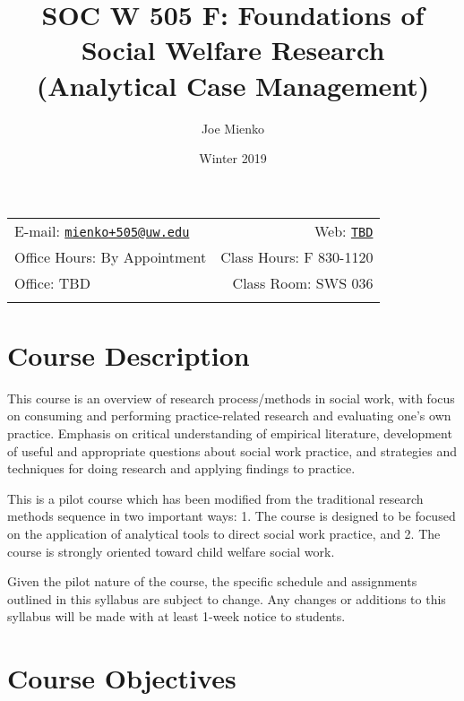 \documentclass[11pt,]{article}
\title{SOC W 505 F: Foundations of Social Welfare Research (Analytical Case
Management)}
\author{Joe Mienko}
\date{Winter 2019}
\begin{document}
  

		\maketitle
		
	
		\thispagestyle{firststyle}



	\noindent \begin{tabular*}{\textwidth}{ @{\extracolsep{\fill}} lr @{\extracolsep{\fill}}}


E-mail: \texttt{\href{mailto:mienko+505@uw.edu}{\nolinkurl{mienko+505@uw.edu}}} & Web: \href{http://TBD}{\tt TBD}\\
Office Hours: By Appointment  &  Class Hours: F 830-1120\\
Office: TBD  & Class Room: SWS 036\\
	&  \\
	\hline
	\end{tabular*}
	
\vspace{2mm}
	


\section{Course Description}\label{course-description}

This course is an overview of research process/methods in social work,
with focus on consuming and performing practice-related research and
evaluating one's own practice. Emphasis on critical understanding of
empirical literature, development of useful and appropriate questions
about social work practice, and strategies and techniques for doing
research and applying findings to practice.

This is a pilot course which has been modified from the traditional
research methods sequence in two important ways: 1. The course is
designed to be focused on the application of analytical tools to direct
social work practice, and 2. The course is strongly oriented toward
child welfare social work.

Given the pilot nature of the course, the specific schedule and
assignments outlined in this syllabus are subject to change. Any changes
or additions to this syllabus will be made with at least 1-week notice
to students.

\section{Course Objectives}\label{course-objectives}
\end{document}
